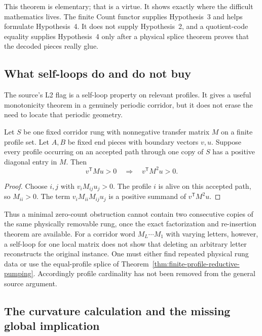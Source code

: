 This theorem is elementary; that is a virtue.  It shows exactly where the
difficult mathematics lives.  The finite Count functor supplies
Hypothesis~3 and helps formulate Hypothesis~4.  It does not supply
Hypothesis~2, and a quotient-code equality supplies Hypothesis~4 only after a
physical splice theorem proves that the decoded pieces really glue.

\subsection{What self-loops do and do not buy}

The source's L2 flag is a self-loop property on relevant profiles.  It gives
a useful monotonicity theorem in a genuinely periodic corridor, but it does
not erase the need to locate that periodic geometry.

\begin{lemma}
\label{lem:one-rung-padding}
Let $S$ be one fixed corridor rung with nonnegative transfer matrix $M$ on a
finite profile set.  Let $A,B$ be fixed end pieces with boundary vectors
$v,u$.  Suppose every profile occurring on an accepted path through one copy
of $S$ has a positive diagonal entry in $M$.  Then
\[
                    v^{\mathsf T}Mu>0
       \quad\Longrightarrow\quad
                    v^{\mathsf T}M^2u>0.
\]
\end{lemma}

\begin{proof}
Choose $i,j$ with $v_iM_{ij}u_j>0$.  The profile $i$ is alive on this accepted
path, so $M_{ii}>0$.  The term
$v_iM_{ii}M_{ij}u_j$ is a positive summand of $v^{\mathsf T}M^2u$.
\end{proof}

Thus a minimal zero-count obstruction cannot contain two consecutive copies
of the same physically removable rung, once the exact factorization and
re-insertion theorem are available.  For a corridor word
$M_L\cdots M_1$ with varying letters, however, a self-loop for one local
matrix does not show that deleting an arbitrary letter reconstructs the
original instance.  One must either find repeated physical rung data or use
the equal-profile splice of Theorem~\ref{thm:finite-profile-reductive-pumping}.
Accordingly profile cardinality has not been removed from the general source
argument.

\subsection{The curvature calculation and the missing global implication}

